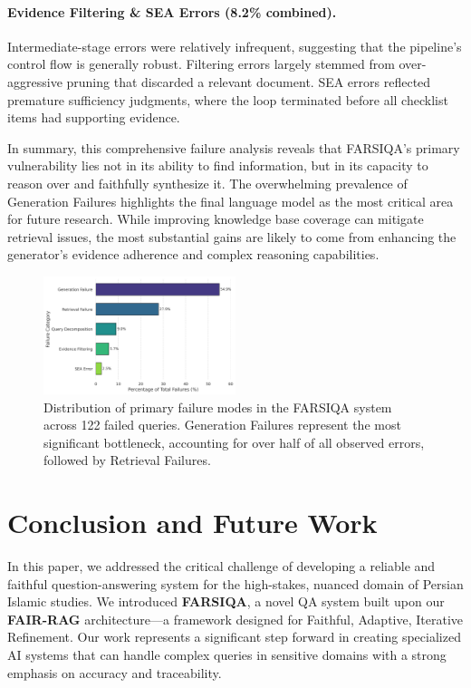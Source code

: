 \documentclass[11pt]{article}
\begin{document}
\paragraph{Evidence Filtering \& SEA Errors (8.2\% combined).} Intermediate-stage errors were relatively infrequent, suggesting that the pipeline's control flow is generally robust. Filtering errors largely stemmed from over-aggressive pruning that discarded a relevant document. SEA errors reflected premature sufficiency judgments, where the loop terminated before all checklist items had supporting evidence.

In summary, this comprehensive failure analysis reveals that FARSIQA's primary vulnerability lies not in its ability to find information, but in its capacity to reason over and faithfully synthesize it. The overwhelming prevalence of Generation Failures highlights the final language model as the most critical area for future research. While improving knowledge base coverage can mitigate retrieval issues, the most substantial gains are likely to come from enhancing the generator's evidence adherence and complex reasoning capabilities.

\begin{figure}[t]
\centering
\includegraphics[width=0.5\textwidth]{figure_7.png}
\caption{Distribution of primary failure modes in the FARSIQA system across 122 failed queries. Generation Failures represent the most significant bottleneck, accounting for over half of all observed errors, followed by Retrieval Failures.}
\label{fig:failure-modes}
\end{figure}

\section{Conclusion and Future Work}

In this paper, we addressed the critical challenge of developing a reliable and faithful question-answering system for the high-stakes, nuanced domain of Persian Islamic studies. We introduced \textbf{FARSIQA}, a novel QA system built upon our \textbf{FAIR-RAG} architecture---a framework designed for Faithful, Adaptive, Iterative Refinement. Our work represents a significant step forward in creating specialized AI systems that can handle complex queries in sensitive domains with a strong emphasis on accuracy and traceability.
\end{document}
